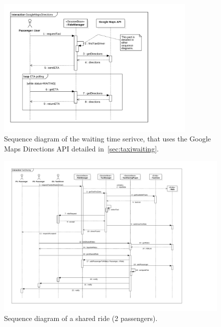 \begin{figure}[h]
    \centering
    \includegraphics[width=0.85\textwidth]{diagrams/sequence_gmaps}
    \caption{Sequence diagram of the waiting time serivce, that uses the Google Maps Directions API detailed in~\autoref{sec:taxiwaiting}.}
    \label{fig:sequence-gmaps}
\end{figure}

\begin{figure}[h]
    \centering
    \includegraphics[width=\textwidth]{diagrams/sequence_taxisharing}
    \caption{Sequence diagram of a shared ride (2 passengers).}
    \label{fig:sequence-sharing}
\end{figure}

\FloatBarrier
